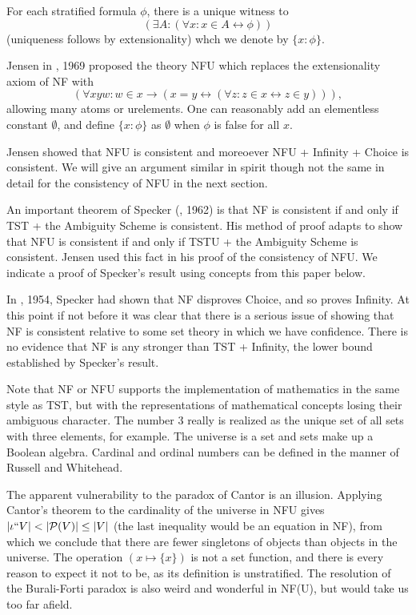 \documentclass[112pt]{article}
\begin{document}
For each stratified formula $\phi$, there is a unique witness to $$(\exists A:(\forall x:x \in A \leftrightarrow \phi))$$ (uniqueness follows by extensionality) whch we denote by $\{x:\phi\}$.

Jensen in \cite{nfu}, 1969 proposed the theory NFU which replaces the extensionality axiom of NF with $$(\forall xyw:w \in x \rightarrow (x=y \leftrightarrow (\forall z:z \in x \leftrightarrow z\in y))),$$  allowing many atoms or urelements.  One can reasonably add an elementless constant $\emptyset$, and define $\{x:\phi\}$ as $\emptyset$ when $\phi$ is false for all $x$.

Jensen showed that NFU is consistent and moreoever NFU + Infinity + Choice is consistent.  We will give an argument similar in spirit though not the same in detail for the consistency of NFU in the next section.

An important theorem of Specker (\cite{ambiguity}, 1962) is that NF is consistent if and only if TST + the Ambiguity Scheme is consistent.  His method of proof adapts to show that  NFU is consistent if and only if TSTU + the Ambiguity Scheme is consistent.  Jensen used this fact in his proof of the consistency of NFU.  We indicate a proof of Specker's result using concepts from this paper below.

In \cite{notac}, 1954, Specker had shown that NF disproves Choice, and so proves Infinity.  At this point if not before it was clear that there is a serious issue of showing that NF is consistent relative to some set theory in which we have confidence.  There is no evidence that NF is any stronger than TST + Infinity, the lower bound established by Specker's result.

Note that NF or NFU supports the implementation of mathematics in the same style as TST, but with the representations of mathematical concepts losing their ambiguous character.  The number 3 really is realized as the unique set of all sets with three elements, for example.  The universe is a set and sets make up a Boolean algebra.   Cardinal and ordinal numbers can be defined
in the manner of Russell and Whitehead.

The apparent vulnerability to the paradox of Cantor is an illusion.  Applying Cantor's theorem to the cardinality of the universe in NFU gives $|\iota``V| < |{\cal P}(V)| \leq |V|$ (the last inequality would be an equation in NF), from which we conclude that there are fewer singletons of objects than objects in the universe.  The operation $(x \mapsto \{x\})$ is not a set function, and there is every reason to expect it not to be, as its definition is unstratified.  The resolution of the Burali-Forti paradox is also weird and wonderful in NF(U), but would take us too far afield.
\end{document}

